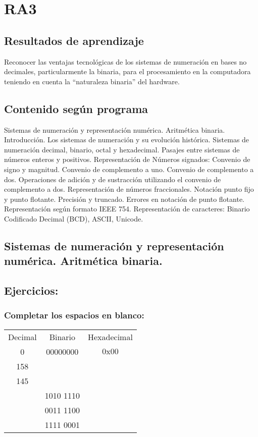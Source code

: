\section{RA3}
\subsection*{Resultados de aprendizaje}
Reconocer las ventajas tecnológicas de los sistemas de numeración en bases no decimales, particularmente la binaria, para el procesamiento en la computadora teniendo en cuenta la ``naturaleza binaria'' del hardware.

\subsection*{Contenido según programa}
Sistemas de numeración y representación numérica.  Aritmética binaria.  Introducción. Los sistemas de numeración y su evolución histórica.  Sistemas de numeración decimal, binario, octal y hexadecimal. Pasajes entre sistemas de números enteros y positivos.  Representación de Números signados: Convenio de signo y magnitud. Convenio de complemento a uno.  Convenio de complemento a dos. Operaciones de adición y de sustracción utilizando el convenio de complemento a dos.  Representación de números fraccionales. Notación punto fijo y punto flotante.  Precisión y truncado.  Errores en notación de punto flotante.  Representación según formato IEEE 754.  Representación de caracteres: Binario Codificado Decimal (BCD), ASCII, Unicode.

\subsection*{Sistemas de numeración y representación numérica. Aritmética binaria.}
\setcounter{subsection}{2}
\subsection{Ejercicios:}

\subsubsection{Completar los espacios en blanco:}
\begin{tabular}{ccc}
  Decimal&Binario&Hexadecimal\\
  0&00000000&$\mathrm{0x00}$ \\
  158& &\underspace\\
  145&\underspace &\underspace \\
  \underspace&1010 1110&\underspace \\
  \underspace&0011 1100&\underspace \\
  \underspace&1111 0001&\underspace \\
\end{tabular}

